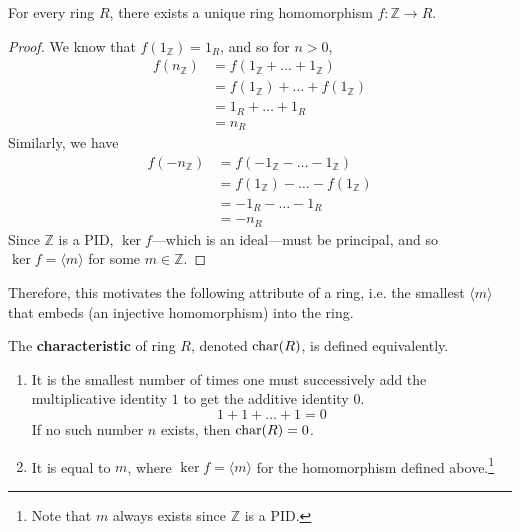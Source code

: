   \begin{theorem}
    \label{thm:integer-ring-exists-in-any-ring}
    For every ring $R$, there exists a unique ring homomorphism $f: \mathbb{Z} \to R$. 
  \end{theorem}
  \begin{proof}
    We know that $f(1_{\mathbb{Z}}) = 1_R$, and so for $n > 0$, 
    \begin{align}
      f(n_{\mathbb{Z}}) & = f(1_{\mathbb{Z}} + \ldots + 1_{\mathbb{Z}}) \\
                        & = f(1_{\mathbb{Z}}) + \ldots + f(1_{\mathbb{Z}}) \\
                        & = 1_R + \ldots + 1_R \\
                        & = n_R
    \end{align} 
    Similarly, we have 
    \begin{align}
      f(-n_{\mathbb{Z}}) & = f(-1_{\mathbb{Z}} - \ldots - 1_{\mathbb{Z}}) \\
                         & = f(1_{\mathbb{Z}}) - \ldots - f(1_{\mathbb{Z}}) \\
                         & = -1_R - \ldots - 1_R \\
                         & = -n_R
    \end{align} 
    Since $\mathbb{Z}$ is a PID, $\ker{f}$---which is an ideal---must be principal, and so $\ker{f} = \langle m \rangle$ for some $m \in \mathbb{Z}$. 
  \end{proof} 

  Therefore, this motivates the following attribute of a ring, i.e. the smallest $\langle m \rangle$ that embeds (an injective homomorphism) into the ring. 

  \begin{definition}
    \label{def:characteristic-number}
    The \textbf{characteristic} of ring $R$, denoted $\operatorname{char}(R)$, is defined equivalently. 
    \begin{enumerate}
      \item It is the smallest number of times one must successively add the multiplicative identity $1$ to get the additive identity $0$. 
      \begin{equation}
        1 + 1 + ... + 1 = 0 
      \end{equation}
      If no such number $n$ exists, then $\operatorname{char}(R) = 0$. 

    \item It is equal to $m$, where $\ker{f} = \langle m \rangle$ for the homomorphism defined above.\footnote{Note that $m$ always exists since $\mathbb{Z}$ is a PID.}
    \end{enumerate}
  \end{definition}

